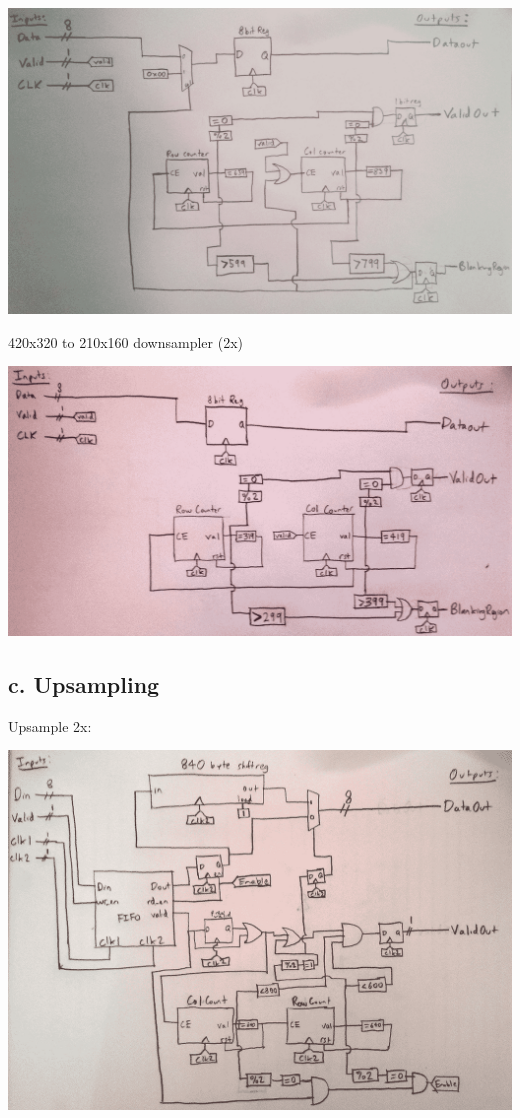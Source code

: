 \documentclass[11pt]{article}
\begin{document}
\noindent\includegraphics[width=\textwidth]{modules/procdownsampler2x.png}

420x320 to 210x160 downsampler (2x)

\noindent\includegraphics[width=\textwidth]{modules/procdownsampler2x_simple.png}

\subsection*{c. Upsampling}

Upsample 2x:

\noindent\includegraphics[width=\textwidth]{modules/procupsample2x.png}
\end{document}
